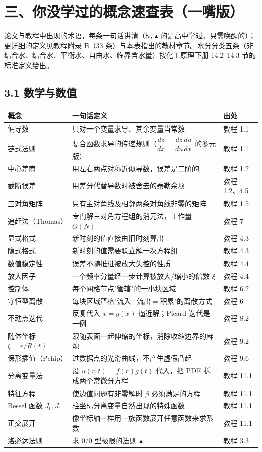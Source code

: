 \documentclass[12pt,a4paper]{ctexart}
\begin{document}
\section{三、你没学过的概念速查表（一嘴版）}

论文与教程中出现的术语，每条一句话讲清（标 $\blacktriangle$ 的是高中学过、只需唤醒的）；更详细的定义见教程附录 B（33 条）与本表指出的教材章节。水分分类五条（非结合水、结合水、平衡水、自由水、临界含水量）按化工原理下册 14.2--14.3 节的标准定义给出。

\subsection{3.1 数学与数值}

\begin{center}
{\begin{tabular}{p{2.7cm}p{8.3cm}p{3.4cm}}
\toprule
概念 & 一句话定义 & 出处 \\
\midrule
偏导数 & 只对一个变量求导、其余变量当常数 & 教程 1.1 \\
链式法则 & 复合函数求导的传递规则（$\dfrac{dz}{dx}=\dfrac{dz}{du}\dfrac{du}{dx}$ 的多元版） & 教程 1.1 \\
中心差商 & 用左右两点对称近似导数，误差是二阶的 & 教程 1.2 \\
截断误差 & 用差分代替导数时被舍去的泰勒余项 & 教程 1.2、4.5 \\
三对角矩阵 & 只有主对角线及相邻两条对角线非零的矩阵 & 教程 1.5 \\
追赶法（Thomas） & 专门解三对角方程组的消元法，工作量 $O(N)$ & 教程 7 \\
显式格式 & 新时刻的值直接由旧时刻算出 & 教程 4.3 \\
隐式格式 & 新时刻的值需要联立解一次方程组 & 教程 4.3 \\
数值稳定性 & 误差不随推进被放大失控的性质 & 教程 4.4 \\
放大因子 & 一个频率分量经一步计算被放大/缩小的倍数 $\xi$ & 教程 4.4 \\
控制体 & 每个网格节点"管辖"的一小块区域 & 教程 6.2 \\
守恒型离散 & 每块区域严格"流入$-$流出$=$积累"的离散方式 & 教程 6 \\
不动点迭代 & 反复代入 $x=g(x)$ 逼近解；Picard 迭代是一例 & 教程 8.2 \\
随体坐标 $\zeta=r/R(t)$ & 跟随表面一起伸缩的坐标，消除收缩边界的麻烦 & 教程 9.2 \\
保形插值（Pchip） & 过数据点的光滑曲线，不产生虚假凸起 & 教程 9.6 \\
分离变量法 & 设 $u(r,t)=f(r)g(t)$ 代入，把 PDE 拆成两个常微分方程 & 教程 11.1 \\
特征方程 & 使边值问题有非零解时 $\beta$ 必须满足的方程 & 教程 11.1 \\
Bessel 函数 $J_0,J_1$ & 柱坐标分离变量自然出现的特殊函数 & 教程 11.1 \\
正交展开 & 像坐标轴一样用一族函数展开任意函数来求系数 & 教程 11.1 \\
洛必达法则 & 求 $0/0$ 型极限的法则 $\blacktriangle$ & 教程 3.3 \\
\bottomrule
\end{tabular}}
\end{center}
\end{document}
